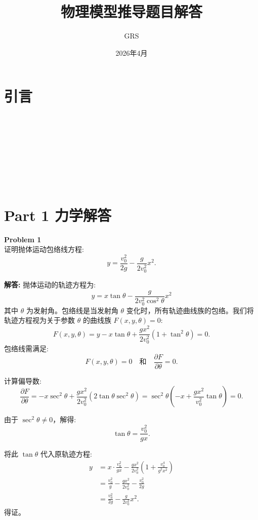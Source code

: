 \documentclass[12pt, a4paper, oneside]{ctexart}
\title{\textbf{物理模型推导题目解答}}
\author{GRS}
\date{2026年4月}
\newenvironment{solution}{\par\noindent\textbf{解答:}\quad}{\par}
\begin{document}
\maketitle
\newpage
\section*{引言}
\\
\\
\\
\\
\\
\\ 
\\
\newpage
\section*{Part 1 力学解答}

\begin{mdframed}[backgroundcolor=gray!10, linewidth=0pt]
    \textbf{Problem 1} \\
    证明抛体运动包络线方程:
    \[
    y = \frac{v_0^2}{2g} - \frac{g}{2v_0^2} x^2.
    \]
\end{mdframed}
\begin{solution}
    抛体运动的轨迹方程为:
    \[
    y = x \tan\theta - \frac{g}{2v_0^2 \cos^2\theta} x^2
    \]
    其中 \(\theta\) 为发射角。包络线是当发射角 \(\theta\) 变化时，所有轨迹曲线族的包络。我们将轨迹方程视为关于参数 \(\theta\) 的曲线族 \(F(x, y, \theta) = 0\):
    \[
    F(x, y, \theta) = y - x\tan\theta + \frac{gx^2}{2v_0^2} (1 + \tan^2\theta) = 0.
    \]
    包络线需满足:
    \[
    F(x, y, \theta) = 0 \quad \text{和} \quad \frac{\partial F}{\partial \theta} = 0.
    \]
    
    计算偏导数:
    \[
    \frac{\partial F}{\partial \theta} = -x\sec^2\theta + \frac{gx^2}{2v_0^2} (2\tan\theta \sec^2\theta) = \sec^2\theta \left( -x + \frac{gx^2}{v_0^2} \tan\theta \right) = 0.
    \]
    
    由于 \(\sec^2\theta \neq 0\)，解得:
    \[
    \tan\theta = \frac{v_0^2}{gx}.
    \]
    
    将此 \(\tan\theta\) 代入原轨迹方程:
    \begin{align*}
        y &= x \cdot \frac{v_0^2}{gx} - \frac{gx^2}{2v_0^2} \left(1 + \frac{v_0^4}{g^2 x^2}\right) \\
        &= \frac{v_0^2}{g} - \frac{gx^2}{2v_0^2} - \frac{v_0^2}{2g} \\
        &= \frac{v_0^2}{2g} - \frac{g}{2v_0^2} x^2.
    \end{align*}
    得证。
\end{solution}
\end{document}
